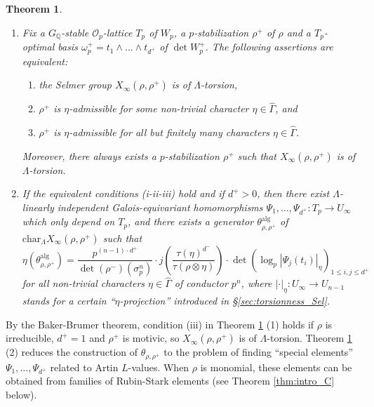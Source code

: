 \documentclass[12pt]{amsart}
\newcommand\bQ{\mathbb{Q}}
\newcommand\cO{\mathcal{O}}
\newcommand{\alg}{\textrm{alg}}
\renewcommand{\char}{\textrm{char}}
\theoremstyle{defstyle}
\theoremstyle{thmstyle}
\newtheorem{THM}{Theorem}
\begin{document}
\begin{THM}\label{thm:intro_A}
\begin{enumerate}
	\item[(1)] Fix a $G_{\bQ}$-stable $\cO_p$-lattice $T_p$ of $W_p$, a $p$-stabilization $\rho^+$ of $\rho$ and a $T_p$-optimal basis $\omega_{p}^+=t_1\wedge\ldots\wedge t_{d^+}$ of $\det W_p^+$. The following assertions are equivalent: 
\begin{enumerate}
	\item[(i)] the Selmer group $X_\infty(\rho,\rho^+)$ is of $\Lambda$-torsion, 
	\item[(ii)] $\rho^+$ is $\eta$-admissible for some non-trivial character $\eta\in \widehat{\Gamma}$, and
	\item[(iii)] $\rho^+$ is $\eta$-admissible for all but finitely many characters $\eta\in\widehat{\Gamma}$.
\end{enumerate} 
Moreover, there always exists a $p$-stabilization $\rho^+$ such that $X_\infty(\rho,\rho^+)$ is of $\Lambda$-torsion.

\item[(2)] If the equivalent conditions (i-ii-iii) hold and if $d^+>0$, then there exist $\Lambda$-linearly independent Galois-equivariant homomorphisms $\Psi_1,\ldots,\Psi_{d^+}\colon T_p \longrightarrow U_\infty$ which only depend on $T_p$, and there exists a generator $\theta^\alg_{\rho,\rho^+}$ of $\char_\Lambda X_\infty(\rho,\rho^+)$ such that 
\begin{equation*}
\eta(\theta^\alg_{\rho,\rho^+}) = \frac{p^{(n-1)\cdot d^+}}{\det(\rho^-)(\sigma_p^n)} \cdot j\left(\frac{\tau(\eta)^{d^-}}{\tau(\rho\otimes\eta)}\right) \cdot\det \left(\log_p|\Psi_j(t_i)|_\eta\right)_{1\leq i,j \leq d^+}
\end{equation*}
for all non-trivial characters $\eta\in\widehat{\Gamma}$ of conductor $p^n$, where $|\cdot|_\eta:U_\infty \longrightarrow U_{n-1}$ stands for a certain ``$\eta$-projection'' introduced in \S\ref{sec:torsionness_Sel}.
\end{enumerate}
\end{THM}
By the Baker-Brumer theorem, condition (iii) in Theorem \ref{thm:intro_A} (1) holds if $\rho$ is irreducible, $d^+=1$ and $\rho^+$ is motivic, so $X_\infty(\rho,\rho^+)$ is of $\Lambda$-torsion. Theorem \ref{thm:intro_A} (2) reduces the construction of $\theta_{\rho,\rho^+}$ to the problem of finding ``special elements'' $\Psi_1,\ldots,\Psi_{d^+}$ related to Artin $L$-values. When $\rho$ is monomial, these elements can be obtained from families of Rubin-Stark elements (see Theorem \ref{thm:intro_C} below).
\end{document}
